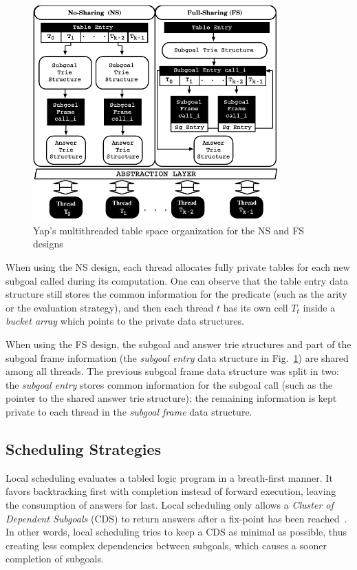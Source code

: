\documentclass{llncs}
\begin{document}
\begin{figure}[!ht]
\vspace{-0.5\intextsep}
\centering
\includegraphics[width=9.5cm]{figures/yap-mt.pdf}
\caption{Yap's multithreaded table space organization for the NS and FS designs}
\label{fig_yap_mt_support}
\vspace{-0.5\intextsep}
\end{figure}

When using the NS design, each thread allocates fully private tables
for each new subgoal called during its computation. One can observe
that the table entry data structure still stores the common
information for the predicate (such as the arity or the evaluation
strategy), and then each thread $t$ has its own cell $T_t$ inside a
\emph{bucket array} which points to the private data structures.

When using the FS design, the subgoal and answer trie structures and
part of the subgoal frame information (the \emph{subgoal entry} data
structure in Fig.~\ref{fig_yap_mt_support}) are shared among all
threads. The previous subgoal frame data structure was split in two:
the \emph{subgoal entry} stores common information for the subgoal
call (such as the pointer to the shared answer trie structure); the
remaining information is kept private to each thread in the
\emph{subgoal frame} data structure.


\subsection{Scheduling Strategies}

Local scheduling evaluates a tabled logic program in a breath-first
manner. It favors backtracking first with completion instead of
forward execution, leaving the consumption of answers for last. Local
scheduling only allows a \emph{Cluster of Dependent Subgoals} (CDS) to
return answers after a fix-point has been reached~\cite{Freire-96}. In
other words, local scheduling tries to keep a CDS as minimal as
possible, thus creating less complex dependencies between subgoals,
which causes a sooner completion of subgoals.
\end{document}
